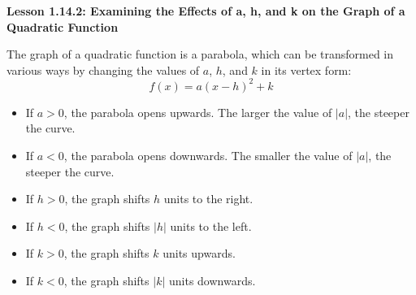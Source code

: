 \begin{center}
\textbf{Lesson 1.14.2: Examining the Effects of a, h, and k on the Graph of a Quadratic Function}
\end{center}

\vspace*{1ex}

The graph of a quadratic function is a parabola, which can be transformed in various ways by changing the values of $a$, $h$, and $k$ in its vertex form:
\[ f(x) = a(x - h)^2 + k \]

\begin{itemize}
    \item If $a > 0$, the parabola opens upwards. The larger the value of $|a|$, the steeper the curve.
    \item If $a < 0$, the parabola opens downwards. The smaller the value of $|a|$, the steeper the curve.


    \item If $h > 0$, the graph shifts $h$ units to the right.
    \item If $h < 0$, the graph shifts $|h|$ units to the left.


    \item If $k > 0$, the graph shifts $k$ units upwards.
    \item If $k < 0$, the graph shifts $|k|$ units downwards.
\end{itemize}

